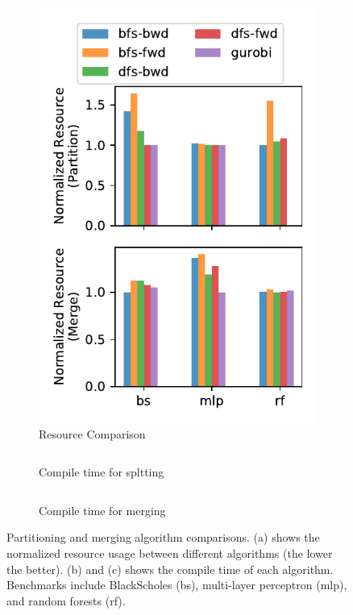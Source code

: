 \begin{figure}
\centering
\hfill
\begin{subfigure}[b]{0.35\textwidth}
\includegraphics[width=1\textwidth]{figs/algo2.pdf}
\caption{Resource Comparison}
\end{subfigure}
\hfill
\begin{subfigure}[b]{0.64\textwidth}
\centering
\begin{tabular}{lccccc}
  \toprule
  
 \bottomrule
\end{tabular}
\caption{
  Compile time for spltting
}
\vspace{0.1cm}
\begin{tabular}{lccccc}
  \toprule
  
 \bottomrule
\end{tabular}
\caption{
  Compile time for merging
}
\vspace{0.65cm}
\end{subfigure}
\hfill
\caption[Partitioning and merging algorithm comparisons]{
  Partitioning and merging algorithm comparisons. (a) shows the normalized resource usage between
  different algorithms (the lower the better). (b) and (c) shows the compile time of each algorithm.
  Benchmarks include BlackScholes (bs), multi-layer perceptron (mlp), and random forests (rf).
}
\label{fig:split}
\end{figure}

